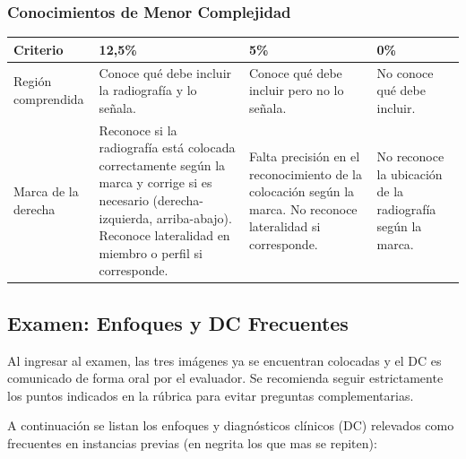 \newpage
\subsubsection*{Conocimientos de Menor Complejidad}

\begin{table}[h]
\centering
\renewcommand{\arraystretch}{1.5}
\begin{tabular}{|p{3cm}|p{4.5cm}|p{4.5cm}|p{3.5cm}|}
\hline
\textbf{Criterio} & \textbf{12,5\%} & \textbf{5\%} & \textbf{0\%} \\
\hline
Región comprendida &
Conoce qué debe incluir la radiografía y lo señala. &
Conoce qué debe incluir pero no lo señala. &
No conoce qué debe incluir. \\
\hline
Marca de la derecha &
Reconoce si la radiografía está colocada correctamente según la marca y corrige si es necesario (derecha-izquierda, arriba-abajo). Reconoce lateralidad en miembro o perfil si corresponde. &
Falta precisión en el reconocimiento de la colocación según la marca. No reconoce lateralidad si corresponde. &
No reconoce la ubicación de la radiografía según la marca. \\
\hline
\end{tabular}
\end{table}

\clearpage

\subsection*{Examen: Enfoques y DC Frecuentes}

Al ingresar al examen, las tres imágenes ya se encuentran colocadas y el DC
es comunicado de forma oral por el evaluador. Se recomienda seguir estrictamente
los puntos indicados en la rúbrica para evitar preguntas complementarias.

A continuación se listan los enfoques y diagnósticos clínicos (DC) relevados
como frecuentes en instancias previas (en negrita los que mas se repiten):


